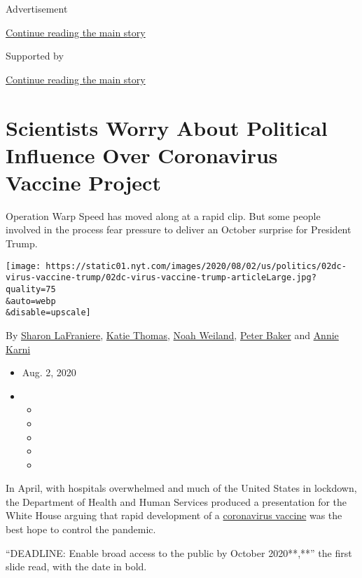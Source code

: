 Advertisement

\protect\hyperlink{after-top}{Continue reading the main story}

Supported by

\protect\hyperlink{after-sponsor}{Continue reading the main story}

\hypertarget{scientists-worry-about-political-influence-over-coronavirus-vaccine-project}{%
\section{Scientists Worry About Political Influence Over Coronavirus
Vaccine
Project}\label{scientists-worry-about-political-influence-over-coronavirus-vaccine-project}}

Operation Warp Speed has moved along at a rapid clip. But some people
involved in the process fear pressure to deliver an October surprise for
President Trump.

\texttt{[image: https://static01.nyt.com/images/2020/08/02/us/politics/02dc-virus-vaccine-trump/02dc-virus-vaccine-trump-articleLarge.jpg?quality=75\\\&auto=webp\\\&disable=upscale]}

By \href{https://www.nytimes.com/by/sharon-lafraniere}{Sharon
LaFraniere}, \href{https://www.nytimes.com/by/katie-thomas}{Katie
Thomas}, \href{https://www.nytimes.com/by/noah-weiland}{Noah Weiland},
\href{https://www.nytimes.com/by/peter-baker}{Peter Baker} and
\href{https://www.nytimes.com/by/annie-karni}{Annie Karni}

\begin{itemize}
\item
  Aug. 2, 2020
\item
  \begin{itemize}
  \item
  \item
  \item
  \item
  \item
  \end{itemize}
\end{itemize}

In April, with hospitals overwhelmed and much of the United States in
lockdown, the Department of Health and Human Services produced a
presentation for the White House arguing that rapid development of a
\href{https://www.nytimes.com/interactive/2020/science/coronavirus-vaccine-tracker.html}{coronavirus
vaccine} was the best hope to control the pandemic.

``DEADLINE: Enable broad access to the public by October 2020**,**'' the
first slide read, with the date in bold.

